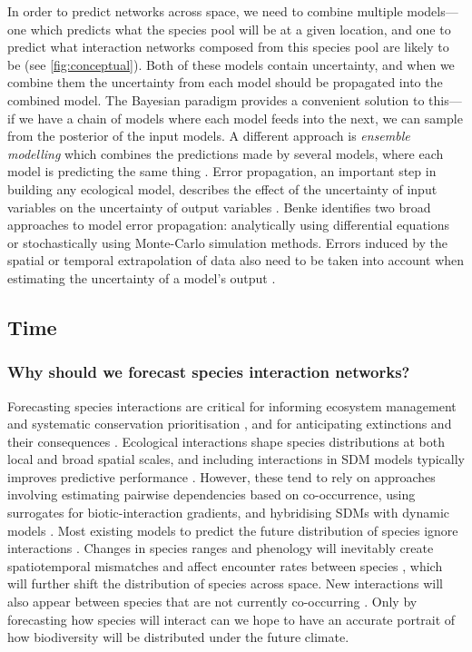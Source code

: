 In order to predict networks across space, we need to combine multiple
models---one which predicts what the species pool will be at a given
location, and one to predict what interaction networks composed from
this species pool are likely to be (see \autoref{fig:conceptual}). Both of these
models contain uncertainty, and when we combine them the uncertainty
from each model should be propagated into the combined model. The
Bayesian paradigm provides a convenient solution to this---if we have a
chain of models where each model feeds into the next, we can sample from
the posterior of the input models. A different approach is
\emph{ensemble modelling} which combines the predictions made by several
models, where each model is predicting the same thing
\cite{Parker2013EnsMod}. Error propagation, an important step in
building any ecological model, describes the effect of the uncertainty
of input variables on the uncertainty of output variables
\cite{Draper1995AssPro, Parysow2000EffApp}. Benke\cite{Benke2018ErrPro} identifies
two broad approaches to model error propagation: analytically using
differential equations or stochastically using Monte-Carlo simulation
methods. Errors induced by the spatial or temporal extrapolation of data
also need to be taken into account when estimating the uncertainty of a
model's output \cite{Peters2004StrEco}.

\subsection{Time}\label{time}

\subsubsection{Why should we forecast species interaction
networks?}\label{why-should-we-forecast-species-interaction-networks}

Forecasting species interactions are critical for informing ecosystem
management \cite{Harvey2017BriEco} and systematic conservation
prioritisation \cite{Pollock2020ProBio}, and for anticipating
extinctions and their consequences \cite{McDonald-Madden2016UsiFoo,
McWilliams2019StaMul}. Ecological interactions shape species
distributions at both local and broad spatial scales, and including
interactions in SDM models typically improves predictive performance
\cite{Araujo2007ImpBio, Wisz2013RolBio, Pigot2013SpeInt}. However,
these tend to rely on approaches involving estimating pairwise
dependencies based on co-occurrence, using surrogates for
biotic-interaction gradients, and hybridising SDMs with dynamic models
\cite{Wisz2013RolBio}. Most existing models to predict the future
distribution of species ignore interactions \cite{Urban2016ImpFor}.
Changes in species ranges and phenology will inevitably create
spatiotemporal mismatches and affect encounter rates between species
\cite{Gilman2010FraCom}, which will further shift the distribution of
species across space. New interactions will also appear between species
that are not currently co-occurring \cite{Gilman2010FraCom}. Only by
forecasting how species will interact can we hope to have an accurate
portrait of how biodiversity will be distributed under the future
climate.

